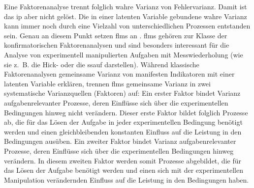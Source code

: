 \documentclass[11pt, twoside, a4paper]{book}		%
\begin{document}
Eine Faktorenanalyse trennt folglich wahre Varianz von Fehlervarianz. Damit ist das \gls{ip} aber nicht gelöst. Die in einer latenten Variable gebundene wahre Varianz kann immer noch durch eine Vielzahl von unterschiedlichen Prozessen entstanden sein. Genau an diesem Punkt setzen \glspl{flm} an \citep[z.~B.][]{Schweizer2006a, Schweizer2006b, Schweizer2007, Schweizer2008, Schweizer2009a}. \glspl{flm} gehören zur Klasse der konfirmatorischen Faktorenanalysen und sind besonders interessant für die Analyse von experimentell manipulierten Aufgaben mit Messwiederholung (wie sie z.~B. die Hick- oder die \gls{ssauf} darstellen). Während klassische Faktorenanalysen gemeinsame Varianz von manifesten Indikatoren mit einer latenten Variable erklären, trennen \glspl{flm} gemeinsame Varianz in zwei systematische Varianzquellen (Faktoren) auf: 
Ein erster Faktor bindet Varianz aufgabenrelevanter Prozesse, deren Einflüsse sich über die experimentellen Bedingungen hinweg nicht verändern. Dieser erste Faktor bildet folglich Prozesse ab, die für das Lösen der Aufgabe in jeder experimentellen Bedingung benötigt werden und einen gleichbleibenden konstanten Einfluss auf die Leistung in den Bedingungen ausüben. 
Ein zweiter Faktor bindet Varianz aufgabenrelevanter Prozesse, deren Einflüsse sich über die experimentellen Bedingungen hinweg verändern. In diesem zweiten Faktor werden somit Prozesse abgebildet, die für das Lösen der Aufgabe benötigt werden und einen sich mit der experimentellen Manipulation verändernden Einfluss auf die Leistung in den Bedingungen haben.
\end{document}
